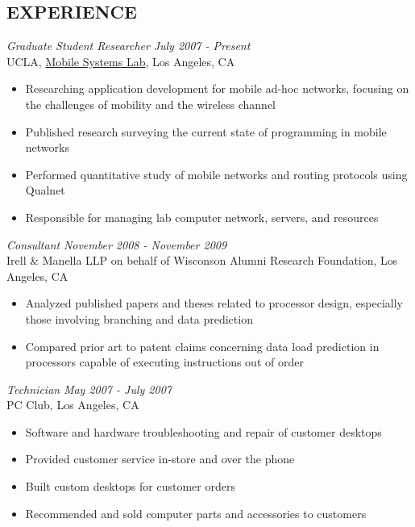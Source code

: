 \documentclass[margin]{res}
\begin{document}
\begin{resume}
\section{EXPERIENCE}

		{\sl Graduate Student Researcher} \hfill \textit{July 2007 - Present} \\
                UCLA, \href{http://msl.cs.ucla.edu}{Mobile Systems Lab}, Los Angeles, CA
		\begin{itemize}  \itemsep -2pt %
		\item Researching application development for mobile ad-hoc networks, focusing on the challenges of mobility and the wireless channel
		\item Published research surveying the current state of programming in mobile networks
		\item Performed quantitative study of mobile networks and routing protocols using Qualnet
		\item Responsible for managing lab computer network, servers, and resources
                \end{itemize}

		{\sl Consultant} \hfill \textit{November 2008 - November 2009} \\
		Irell \& Manella LLP on behalf of Wisconson Alumni Research Foundation, Los Angeles, CA
                 \begin{itemize}  \itemsep -2pt %
                \item Analyzed published papers and theses related to processor design, especially those involving branching and data prediction
		\item Compared prior art to patent claims concerning data load prediction in processors capable of executing instructions out of order
                \end{itemize}

		{\sl Technician} \hfill \textit{May 2007 - July 2007} \\
		PC Club, Los Angeles, CA
                 \begin{itemize}  \itemsep -2pt %
                \item Software and hardware troubleshooting and repair of customer desktops
		\item Provided customer service in-store and over the phone
		\item Built custom desktops for customer orders
                \item Recommended and sold computer parts and accessories to customers
                \end{itemize}


\end{resume}
\end{document}

